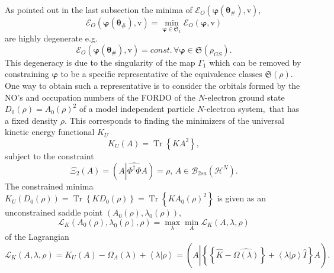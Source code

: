 \documentclass[aps,preprint]{revtex4}%
\begin{document}
As pointed out in the last subsection the minima of $\mathcal{E}_{O}\left(
\boldsymbol{\varphi}\left(  \boldsymbol{\theta}_{\#}\right)  ,\mathrm{v}%
\right)  ,$
\begin{equation}
\mathcal{E}_{O}\left(  \boldsymbol{\varphi}\left(  \boldsymbol{\theta}%
_{\#}\right)  \boldsymbol{,}\mathrm{v}\right)  =\min_{\boldsymbol{\varphi\in
}\mathfrak{S}_{1}}\mathcal{E}_{O}\left(  \boldsymbol{\varphi,}\mathrm{v}%
\right)
\end{equation}
are highly degenerate e.g.
\begin{equation}
\mathcal{E}_{O}\left(  \boldsymbol{\varphi}\left(  \boldsymbol{\theta}%
_{\#}\right)  \boldsymbol{,}\mathrm{v}\right)  =const.\,\forall
\boldsymbol{\varphi\in}\mathfrak{S}\left(  \rho_{GS}\right)  .
\end{equation}
This degeneracy is due to the singularity of the map $\Gamma_{1}$ which can be
removed by constraining $\boldsymbol{\varphi}$ to be a specific representative
of the equivalence classes $\mathfrak{S}\left(  \rho\right)  .$ One way to
obtain such a representative is to consider the orbitals formed by the NO's
and occupation numbers of the FORDO of the $N$-electron ground state
$D_{0}\left(  \rho\right)  =A_{0}\left(  \rho\right)  ^{2}$ of a model
independent particle $N$-electron system$,$ that has a fixed density $\rho.$
This corresponds to finding the minimizers of the universal kinetic energy
functional $K_{U}$
\begin{equation}
K_{U}\left(  A\right)  =\operatorname{Tr}\left\{  KA^{2}\right\}  ,
\end{equation}
subject to the constraint
\begin{equation}
\Xi_{2}\left(  A\right)  =\left(  A\left\vert \widehat{\Phi^{\dagger}\Phi
}A\right.  \right)  =\rho,\,A\in\mathcal{B}_{2sa}\left(  \mathcal{H}%
^{N}\right)  .
\end{equation}
The constrained minima $K_{U}\left(  D_{0}\left(  \rho\right)  \right)
=\operatorname{Tr}\left\{  KD_{0}\left(  \rho\right)  \right\}
=\operatorname{Tr}\left\{  KA_{0}\left(  \rho\right)  ^{2}\right\}  $ is given
as an unconstrained saddle point $\left(  A_{0}\left(  \rho\right)
,\lambda_{0}\left(  \rho\right)  \right)  ,$
\begin{equation}
\mathcal{L}_{K}\left(  A_{0}\left(  \rho\right)  ,\lambda_{0}\left(
\rho\right)  ,\rho\right)  =\max_{\lambda}\min_{A}\mathcal{L}_{K}\left(
A,\lambda,\rho\right)
\end{equation}
of the Lagrangian
\begin{equation}
\mathcal{L}_{K}\left(  A,\lambda,\rho\right)  =K_{U}\left(  A\right)
-\Omega_{A}\left(  \lambda\right)  +\left\langle \left.  \lambda\right\vert
\rho\right\rangle =\left(  A\left\vert \left\{  \left\{  \widehat{K}%
-\widehat{\Omega\left(  \lambda\right)  }\right\}  +\left\langle \left.
\lambda\right\vert \rho\right\rangle \hat{I}\right\}  \right.  A\right)  .
\end{equation}
\end{document}
